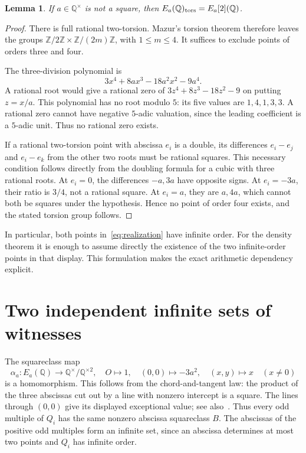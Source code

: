 \documentclass[11pt,a4paper]{article}
\newtheorem{lemma}[theorem]{Lemma}
\newcommand{\Q}{\mathbb Q}\newcommand{\Z}{\mathbb Z}
\begin{document}
\begin{lemma}\label{lem:torsion}
If $a\in\Q^\times$ is not a square, then
$E_a(\Q)_{\rm tors}=E_a[2](\Q)$.
\end{lemma}
\begin{proof}
There is full rational two-torsion.  Mazur's torsion theorem
\cite{Mazur} therefore leaves the groups
$\Z/2\Z\times\Z/(2m)\Z$, with $1\le m\le4$.
It suffices to exclude points of orders three and four.

The three-division polynomial is
\[
                3x^4+8ax^3-18a^2x^2-9a^4.
\]
A rational root would give a rational zero of
$3z^4+8z^3-18z^2-9$ on putting $z=x/a$.
This polynomial has no root modulo $5$: its five values are
$1,4,1,3,3$.  A rational zero cannot have negative $5$-adic
valuation, since the leading coefficient is a $5$-adic unit.
Thus no rational zero exists.

If a rational two-torsion point with abscissa $e_i$ is a double,
its differences $e_i-e_j$ and $e_i-e_k$ from the other two roots
must be rational squares.  This necessary condition follows
directly from the doubling formula for a cubic with three
rational roots.  At $e_i=0$, the differences $-a,3a$ have
opposite signs.  At $e_i=-3a$, their ratio is $3/4$, not a
rational square.  At $e_i=a$, they are $a,4a$, which cannot
both be squares under the hypothesis.  Hence no point of order
four exists, and the stated torsion group follows.
\end{proof}

In particular, both points in~\eqref{eq:realization} have infinite
order.  For the density theorem it is enough to assume directly
the existence of the two infinite-order points in that display.
This formulation makes the exact arithmetic dependency explicit.

\section{Two independent infinite sets of witnesses}

The squareclass map
\[
 \alpha_a:E_a(\Q)\longrightarrow\Q^\times/\Q^{\times2},
 \quad O\longmapsto1,\quad (0,0)\longmapsto-3a^2,
 \quad (x,y)\longmapsto x\quad(x\ne0)
\]
is a homomorphism.  This follows from the chord-and-tangent law:
the product of the three abscissas cut out by a line with nonzero
intercept is a square.  The lines through $(0,0)$ give its
displayed exceptional value; see also~\cite[Lemma~2.2]{Fixed}.
Thus every odd multiple of $Q_i$ has the same nonzero abscissa
squareclass $B$.  The abscissas of the positive odd multiples
form an infinite set, since an abscissa determines at most two
points and $Q_i$ has infinite order.
\end{document}
